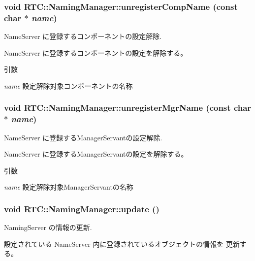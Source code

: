 \subsubsection[{unregisterCompName}]{\setlength{\rightskip}{0pt plus 5cm}void RTC::NamingManager::unregisterCompName (const char $\ast$ {\em name})\hspace{0.3cm}{\ttfamily  [protected]}}\label{classRTC_1_1NamingManager_a038eb214ba1b7a928aa278252ca0f0fb}


NameServer に登録するコンポーネントの設定解除. 

NameServer に登録するコンポーネントの設定を解除する。


\begin{DoxyParams}{引数}
\item[{\em name}]設定解除対象コンポーネントの名称 \end{DoxyParams}
\subsubsection[{unregisterMgrName}]{\setlength{\rightskip}{0pt plus 5cm}void RTC::NamingManager::unregisterMgrName (const char $\ast$ {\em name})\hspace{0.3cm}{\ttfamily  [protected]}}\label{classRTC_1_1NamingManager_a95d0916eda2bc1d3f7599696cf9c0485}


NameServer に登録するManagerServantの設定解除. 

NameServer に登録するManagerServantの設定を解除する。


\begin{DoxyParams}{引数}
\item[{\em name}]設定解除対象ManagerServantの名称 \end{DoxyParams}
\subsubsection[{update}]{\setlength{\rightskip}{0pt plus 5cm}void RTC::NamingManager::update ()}\label{classRTC_1_1NamingManager_a0c71e845495a5eac4e53adb2bf5ae8ec}


NamingServer の情報の更新. 

設定されている NameServer 内に登録されているオブジェクトの情報を 更新する。 

